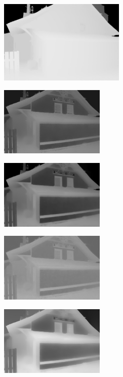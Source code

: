 \begin{figure}[htb]
\begin{subfigure}[b]{1\linewidth}
  \centering
  \centerline{\includegraphics[width=6cm]{hazerd/img/ori}}
  \subcaption{}
\end{subfigure}
\vfill
\begin{subfigure}[b]{0.45\linewidth}
  \centering
  \centerline{\includegraphics[width=5cm]{hazerd/img/he}}
  \subcaption{}
\end{subfigure}
\hfill
\begin{subfigure}[b]{0.45\linewidth}
  \centering
  \centerline{\includegraphics[width=5cm]{hazerd/img/meng}}
  \subcaption{}
\end{subfigure}
\vfill
\begin{subfigure}[b]{0.45\linewidth}
  \centering
  \centerline{\includegraphics[width=5cm]{hazerd/img/zhu}}
  \subcaption{}
\end{subfigure}
\hfill
\begin{subfigure}[b]{0.45\linewidth}
  \centering
  \centerline{\includegraphics[width=5cm]{hazerd/img/berman}}

\end{subfigure}
\end{figure}
